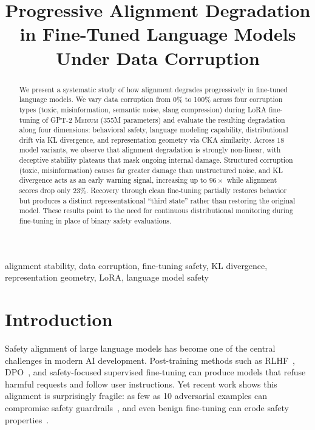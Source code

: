 \documentclass[conference]{IEEEtran}
\title{Progressive Alignment Degradation in Fine-Tuned Language Models Under Data Corruption}
\author{
    \IEEEauthorblockN{Akshay Sasi}
    \IEEEauthorblockA{
        AI Researcher\\
        India\\
        akshaysasi12.knr@gmail.com\\
        ORCID: 0009-0009-3708-554X
    }
}
\newcommand{\model}{\textsc{GPT-2 Medium}}
\begin{document}
\maketitle

\begin{abstract}
We present a systematic study of how alignment degrades progressively in fine-tuned language models. We vary data corruption from 0\% to 100\% across four corruption types (toxic, misinformation, semantic noise, slang compression) during LoRA fine-tuning of \model{} (355M parameters) and evaluate the resulting degradation along four dimensions: behavioral safety, language modeling capability, distributional drift via KL divergence, and representation geometry via CKA similarity. Across 18 model variants, we observe that alignment degradation is strongly non-linear, with deceptive stability plateaus that mask ongoing internal damage. Structured corruption (toxic, misinformation) causes far greater damage than unstructured noise, and KL divergence acts as an early warning signal, increasing up to $96\times$ while alignment scores drop only 23\%. Recovery through clean fine-tuning partially restores behavior but produces a distinct representational ``third state'' rather than restoring the original model. These results point to the need for continuous distributional monitoring during fine-tuning in place of binary safety evaluations.
\end{abstract}

\begin{IEEEkeywords}
alignment stability, data corruption, fine-tuning safety, KL divergence, representation geometry, LoRA, language model safety
\end{IEEEkeywords}

\section{Introduction}
\label{sec:introduction}

Safety alignment of large language models has become one of the central challenges in modern AI development. Post-training methods such as RLHF~\cite{ouyang2022training}, DPO~\cite{rafailov2023direct}, and safety-focused supervised fine-tuning can produce models that refuse harmful requests and follow user instructions. Yet recent work shows this alignment is surprisingly fragile: as few as 10 adversarial examples can compromise safety guardrails~\cite{qi2023fine}, and even benign fine-tuning can erode safety properties~\cite{yang2023shadow}.
\end{document}
